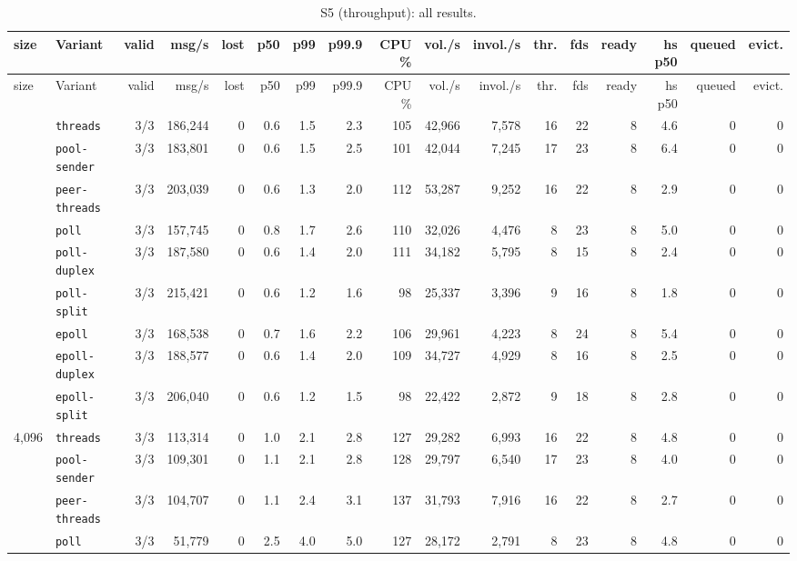 \begin{longtable}{@{}llrrrrrrrrrrrrrrr@{}}
\caption{S5 (throughput): all results.}\label{tab:full-S5}\\
\toprule
size & Variant & valid & msg/s & lost & p50 & p99 & p99.9 & CPU \% & vol./s & invol./s & thr. & fds & ready & hs p50 & queued & evict. \\
\midrule
\endfirsthead
\toprule
size & Variant & valid & msg/s & lost & p50 & p99 & p99.9 & CPU \% & vol./s & invol./s & thr. & fds & ready & hs p50 & queued & evict. \\
\midrule
\endhead
\bottomrule
\endfoot
32 & \texttt{threads} & 3/3 & 186{,}244 & 0 & 0.6 & 1.5 & 2.3 & 105 & 42{,}966 & 7{,}578 & 16 & 22 & 8 & 4.6 & 0 & 0 \\
 & \texttt{pool-sender} & 3/3 & 183{,}801 & 0 & 0.6 & 1.5 & 2.5 & 101 & 42{,}044 & 7{,}245 & 17 & 23 & 8 & 6.4 & 0 & 0 \\
 & \texttt{peer-threads} & 3/3 & 203{,}039 & 0 & 0.6 & 1.3 & 2.0 & 112 & 53{,}287 & 9{,}252 & 16 & 22 & 8 & 2.9 & 0 & 0 \\
 & \texttt{poll} & 3/3 & 157{,}745 & 0 & 0.8 & 1.7 & 2.6 & 110 & 32{,}026 & 4{,}476 & 8 & 23 & 8 & 5.0 & 0 & 0 \\
 & \texttt{poll-duplex} & 3/3 & 187{,}580 & 0 & 0.6 & 1.4 & 2.0 & 111 & 34{,}182 & 5{,}795 & 8 & 15 & 8 & 2.4 & 0 & 0 \\
 & \texttt{poll-split} & 3/3 & 215{,}421 & 0 & 0.6 & 1.2 & 1.6 & 98 & 25{,}337 & 3{,}396 & 9 & 16 & 8 & 1.8 & 0 & 0 \\
 & \texttt{epoll} & 3/3 & 168{,}538 & 0 & 0.7 & 1.6 & 2.2 & 106 & 29{,}961 & 4{,}223 & 8 & 24 & 8 & 5.4 & 0 & 0 \\
 & \texttt{epoll-duplex} & 3/3 & 188{,}577 & 0 & 0.6 & 1.4 & 2.0 & 109 & 34{,}727 & 4{,}929 & 8 & 16 & 8 & 2.5 & 0 & 0 \\
 & \texttt{epoll-split} & 3/3 & 206{,}040 & 0 & 0.6 & 1.2 & 1.5 & 98 & 22{,}422 & 2{,}872 & 9 & 18 & 8 & 2.8 & 0 & 0 \\
\midrule
4{,}096 & \texttt{threads} & 3/3 & 113{,}314 & 0 & 1.0 & 2.1 & 2.8 & 127 & 29{,}282 & 6{,}993 & 16 & 22 & 8 & 4.8 & 0 & 0 \\
 & \texttt{pool-sender} & 3/3 & 109{,}301 & 0 & 1.1 & 2.1 & 2.8 & 128 & 29{,}797 & 6{,}540 & 17 & 23 & 8 & 4.0 & 0 & 0 \\
 & \texttt{peer-threads} & 3/3 & 104{,}707 & 0 & 1.1 & 2.4 & 3.1 & 137 & 31{,}793 & 7{,}916 & 16 & 22 & 8 & 2.7 & 0 & 0 \\
 & \texttt{poll} & 3/3 & 51{,}779 & 0 & 2.5 & 4.0 & 5.0 & 127 & 28{,}172 & 2{,}791 & 8 & 23 & 8 & 4.8 & 0 & 0 \\

\end{longtable}
